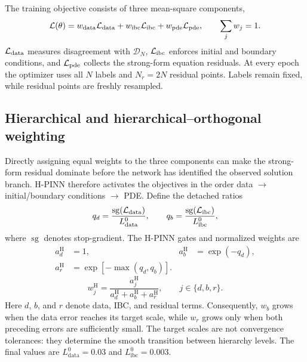 The training objective consists of three mean-square components,
\begin{equation}
    \mathcal L(\theta)
    =w_{\mathrm{data}}\mathcal{L}_{\mathrm{data}}
    +w_{\mathrm{ibc}}\mathcal{L}_{\mathrm{ibc}}
    +w_{\mathrm{pde}}\mathcal{L}_{\mathrm{pde}},
    \qquad \sum_j w_j=1 .
    \label{eq:total_loss}
\end{equation}
\(\mathcal{L}_{\mathrm{data}}\) measures disagreement with \(\mathcal D_N\), \(\mathcal{L}_{\mathrm{ibc}}\) enforces initial and boundary conditions, and \(\mathcal{L}_{\mathrm{pde}}\) collects the strong-form equation residuals. At every epoch the optimizer uses all \(N\) labels and \(N_r=2N\) residual points. Labels remain fixed, while residual points are freshly resampled.

\subsection{Hierarchical and hierarchical--orthogonal weighting}

Directly assigning equal weights to the three components can make the strong-form residual dominate before the network has identified the observed solution branch. H-PINN therefore activates the objectives in the order data \(\rightarrow\) initial/boundary conditions \(\rightarrow\) PDE. Define the detached ratios
\begin{equation}
    q_d=\frac{\operatorname{sg}(\mathcal{L}_{\mathrm{data}})}{L^0_{\mathrm{data}}},
    \qquad
    q_b=\frac{\operatorname{sg}(\mathcal{L}_{\mathrm{ibc}})}{L^0_{\mathrm{ibc}}},
\end{equation}
where \(\operatorname{sg}\) denotes stop-gradient. The H-PINN gates and normalized weights are
\begin{align}
    a_d^{\mathrm H}&=1,
    &a_b^{\mathrm H}&=\exp(-q_d),\\
    a_r^{\mathrm H}&=\exp[-\max(q_d,q_b)].
    \label{eq:h_gates}
\end{align}
\begin{equation}
    w_j^{\mathrm H}
    =\frac{a_j^{\mathrm H}}
    {a_d^{\mathrm H}+a_b^{\mathrm H}+a_r^{\mathrm H}},
    \qquad j\in\{d,b,r\}.
    \label{eq:h_weights}
\end{equation}
Here \(d\), \(b\), and \(r\) denote data, IBC, and residual terms. Consequently, \(w_b\) grows when the data error reaches its target scale, while \(w_r\) grows only when both preceding errors are sufficiently small. The target scales are not convergence tolerances: they determine the smooth transition between hierarchy levels. The final values are \(L^0_{\mathrm{data}}=0.03\) and \(L^0_{\mathrm{ibc}}=0.003\).

